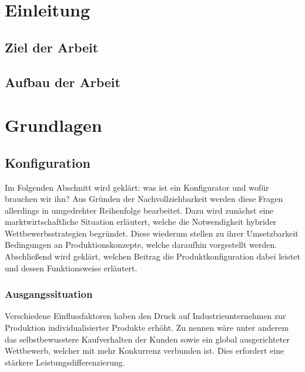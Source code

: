 \documentclass[12pt,a4paper,bibliography=totocnumbered,listof=totoc]{scrartcl}
\begin{document}













\section{Einleitung}

\subsection{Ziel der Arbeit}

\subsection{Aufbau der Arbeit}

\pagebreak

\section{Grundlagen}

\subsection{Konfiguration}
Im Folgenden Abschnitt wird geklärt: was ist ein Konfigurator und wofür brauchen wir ihn? Aus Gründen der Nachvollziehbarkeit werden diese Fragen allerdings in umgedrehter Reihenfolge bearbeitet.
Dazu wird zunächst eine marktwirtschaftliche Situation erläutert, welche die Notwendigkeit hybrider Wettbewerbsstrategien begründet. Diese wiederum stellen zu ihrer Umsetzbarkeit Bedingungen an Produktionskonzepte, welche daraufhin vorgestellt werden. Abschließend wird geklärt, welchen Beitrag die Produktkonfiguration dabei leistet und dessen Funktionsweise erläutert.

\subsubsection{Ausgangssituation}
 \label{subssubsection:Ausgangssituation}
Verschiedene Einflussfaktoren haben den Druck auf Industrieunternehmen zur Produktion individualisierter Produkte erhöht. Zu nennen wäre unter anderem das selbstbewusstere Kaufverhalten der Kunden sowie ein global ausgerichteter Wettbewerb, welcher mit mehr Konkurrenz verbunden ist. Dies erfordert eine stärkere Leistungsdifferenzierung\citep{lutz11}.
\end{document}
